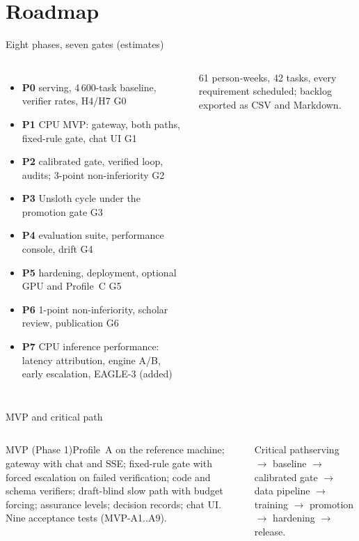 \documentclass[aspectratio=169,10pt]{beamer}
\begin{document}
\section{Roadmap}
\begin{frame}{Eight phases, seven gates (estimates)}
\begin{columns}[T]
\centering\scalebox{0.72}{}
\scriptsize
\begin{itemize}
\item \textbf{P0} serving, 4\,600-task baseline, verifier rates, H4/H7 \hfill G0
\item \textbf{P1} CPU MVP: gateway, both paths, fixed-rule gate, chat UI \hfill G1
\item \textbf{P2} calibrated gate, verified loop, audits; 3-point non-inferiority \hfill G2
\item \textbf{P3} Unsloth cycle under the promotion gate \hfill G3
\item \textbf{P4} evaluation suite, performance console, drift \hfill G4
\item \textbf{P5} hardening, deployment, optional GPU and Profile~C \hfill G5
\item \textbf{P6} 1-point non-inferiority, scholar review, publication \hfill G6
\item \textbf{P7} CPU inference performance: latency attribution, engine A/B, early escalation, EAGLE-3 (added)
\end{itemize}
61 person-weeks, 42 tasks, every requirement scheduled; backlog exported as CSV and Markdown.
\end{columns}
\end{frame}

\begin{frame}{MVP and critical path}
\begin{columns}[T]
\scriptsize
\begin{block}{MVP (Phase 1)}Profile~A on the reference machine; gateway with chat and SSE; fixed-rule gate with forced escalation on failed verification; code and schema verifiers; draft-blind slow path with budget forcing; assurance levels; decision records; chat UI. Nine acceptance tests (MVP-A1..A9).\end{block}
\begin{alertblock}{Critical path}serving $\to$ baseline $\to$ calibrated gate $\to$ data pipeline $\to$ training $\to$ promotion $\to$ hardening $\to$ release.\end{alertblock}
\centering\scalebox{0.46}{}
\end{columns}
\end{frame}
\end{document}
